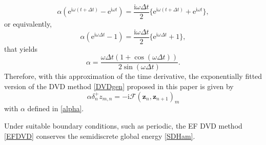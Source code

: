 \documentclass[twoside]{article}
\numberwithin{equation}{section}
\begin{document}
$$\alpha (\mathrm{e}^{\mathrm{i}\omega (t+\Delta t)}-\mathrm{e}^{\mathrm{i}\omega t})=\frac{\mathrm{i} \omega \Delta t}2\{\mathrm{e}^{\mathrm{i}\omega (t+\Delta t)}+\mathrm{e}^{\mathrm{i}\omega t}\},$$
or equivalently,
$$
 \alpha (\mathrm{e}^{\mathrm{i}\omega \Delta t}-1)=\frac{\mathrm{i} \omega \Delta t}2\{\mathrm{e}^{\mathrm{i}\omega \Delta t}+1\},
$$
that yields
\begin{equation}\label{alpha}
\alpha=\frac{\omega \Delta t(1+\cos(\omega \Delta t))}{2\sin(\omega \Delta t)}.
\end{equation}
Therefore, with this approximation of the time derivative, the exponentially fitted version of the DVD method \eqref{DVDgen} proposed in this paper is given by
\begin{equation}\label{EFDVD}
\alpha\delta_n^{+}z_{m,n}=-\mathrm{i}\mathcal{F}(\mathbf{z}_n,\mathbf{z}_{n+1})_m
\end{equation}
with $\alpha$ defined in \eqref{alpha}.
\begin{theorem}
Under suitable boundary conditions, such as periodic, the EF DVD method \eqref{EFDVD} conserves the semidiscrete global energy \eqref{SDHam}.
\end{theorem}
\end{document}
